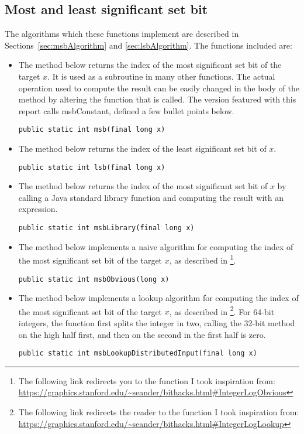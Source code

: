 \subsection{Most and least significant set bit}

The algorithms which these functions implement are described in Sections~\ref{sec:msbAlgorithm} and \ref{sec:lsbAlgorithm}.
The functions included are:

\begin{itemize}
    \item
    The method below returns the index of the most significant set bit of the target $x$. It is used as a subroutine in many other functions. The actual operation used to compute the result can be easily changed in the body of the method by altering the function that is called. The version featured with this report calls {\ttfamily msbConstant}, defined a few bullet points below.
    \begin{lstlisting}
public static int msb(final long x)
    \end{lstlisting}
    
    \item
    The method below returns the index of the least significant set bit of $x$.
    \begin{lstlisting}
public static int lsb(final long x)
    \end{lstlisting}
    
    \item
    The method below returns the index of the most significant set bit of $x$ by calling a Java standard library function and computing the result with an expression.
    \begin{lstlisting}
public static int msbLibrary(final long x)
    \end{lstlisting}
    
    \item
    The method below implements a naive algorithm for computing the index of the most significant set bit of the target $x$, as described in \cite{bittricks}\footnote{The following link redirects you to the function I took inspiration from: \url{https://graphics.stanford.edu/~seander/bithacks.html\#IntegerLogObvious}}.
    \begin{lstlisting}
public static int msbObvious(long x)
    \end{lstlisting}
    
    \item
    The method below implements a lookup algorithm for computing the index of the most significant set bit of the target $x$, as described in \cite{bittricks}\footnote{The following link redirects the reader to the function I took inspiration from: \url{https://graphics.stanford.edu/~seander/bithacks.html\#IntegerLogLookup}}. For 64-bit integers, the function first splits the integer in two, calling the 32-bit method on the high half first, and then on the second in the first half is zero.
    \begin{lstlisting}
public static int msbLookupDistributedInput(final long x)
    \end{lstlisting}


\end{itemize}
